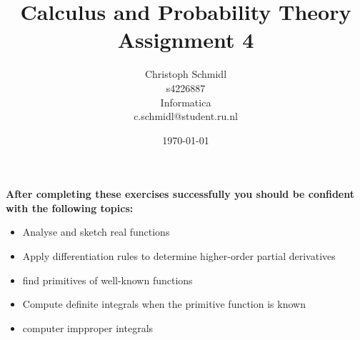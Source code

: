 \documentclass[a4paper]{article}
\title{Calculus and Probability Theory\\ Assignment 4}
\author{Christoph Schmidl\\
s4226887\\
Informatica\\
c.schmidl@student.ru.nl\\}
\date{\today}
\begin{document}
\maketitle





\textbf{After completing these exercises successfully you should be confident with the following topics:}

\begin{itemize}
	\item Analyse and sketch real functions
	\item Apply differentiation rules to determine higher-order partial derivatives
	\item find primitives of well-known functions
	\item Compute definite integrals when the primitive function is known
	\item computer impproper integrals
\end{itemize}
\vspace{1em}
\end{document}
